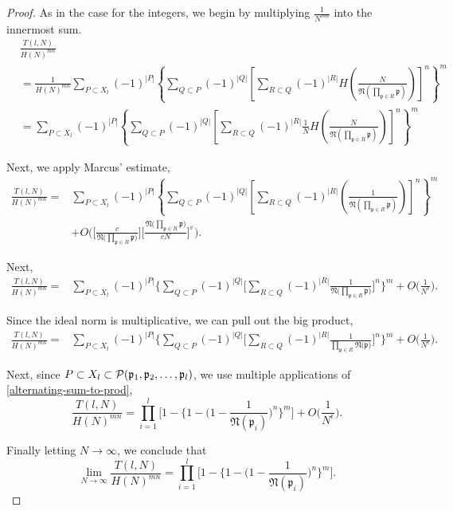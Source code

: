 \documentclass[10pt,a4paper]{article}
\theoremstyle{definition}
\theoremstyle{remark}
\newcommand{\f}[1]{\mathfrak{#1}}
\begin{document}
	\begin{proof}
	As in the case for the integers, we begin by multiplying \(\frac{1}{N^{mn}}\) into the innermost sum.
	\begin{align}
		&\frac{T(l,N)}{H(N)^{mn}} \\
		&= \frac{1}{H(N)^{mn}}\sum_{P\subset X_l}(-1)^{|P|} \left\{\sum_{Q\subset P} (-1)^{|Q|} \left[\sum_{R\subset Q}(-1)^{|R|}H\left(\frac{N}{\f{N}\left(\prod_{\f{p}\in R}\f{p}\right)}\right)\right]^n\right\}^m\\
		&=\sum_{P\subset X_l}(-1)^{|P|} \left\{\sum_{Q\subset P} (-1)^{|Q|} \left[\sum_{R\subset Q}(-1)^{|R|}\frac{1}{N}H\left(\frac{N}{\f{N}\left(\prod_{\f{p}\in R}\f{p}\right)}\right)\right]^n\right\}^m
	\end{align}

	Next, we apply Marcus' estimate,
	\begin{align}
		\frac{T(l,N)}{H(N)^{mn}}=&\sum_{P\subset X_l}(-1)^{|P|} \left\{\sum_{Q\subset P} (-1)^{|Q|} \left[\sum_{R\subset Q}(-1)^{|R|}\left(\frac{1}{\f{N}\left(\prod_{\f{p}\in R}\f{p}\right)}\right)\right]^n\right\}^m \\
		&+ O\Biggl(\Biggl[\frac{c}{\f{N}\bigl(\prod_{\f{p}\in R}\f{p}\bigr)}\Biggl]\Biggr[\frac{\f{N}\bigl(\prod_{\f{p}\in R}\f{p}\bigr)}{cN}\Biggr]^{\varepsilon}\Biggr).
	\end{align}

	Next,
	\begin{equation}
	\begin{split}
		\frac{T(l,N)}{H(N)^{mn}}=&\sum_{P\subset X_l}(-1)^{|P|} \Big\{\sum_{Q\subset P} (-1)^{|Q|} \Big[\sum_{R\subset Q}(-1)^{|R|}\frac{1}{\f{N}\Big(\prod_{\f{p}\in R}\f{p}\Big)} \Big]^n\Big\}^m + O\Big(\frac{1}{N^{\epsilon}}\Big).
	\end{split}
	\end{equation}

	Since the ideal norm is multiplicative, we can pull out the big product,
	\begin{equation}
	\begin{split}
		\frac{T(l,N)}{H(N)^{mn}}=&\sum_{P\subset X_l}(-1)^{|P|} \Biggl\{\sum_{Q\subset P} (-1)^{|Q|} \Biggl[\sum_{R\subset Q}(-1)^{|R|}\frac{1}{\prod_{\f{p}\in R}\f{N}\bigl(\f{p}\bigr)}\Biggr]^n\Biggr\}^m + O\Big(\frac{1}{N^{\epsilon}}\Big).
	\end{split}
        \end{equation}

	Next, since \(P\subset X_l \subset \mathcal{P}(\f{p}_1,\f{p}_2,\mathellipsis,\f{p}_l)\), we use multiple applications of \cref{alternating-sum-to-prod},
		$$\frac{T(l,N)}{H(N)^{mn}}=\prod_{i=1}^{l}\Biggr[1-\Biggr\{1-\Biggl(1-\frac{1}{\f{N}(\f{p}_i)}\Biggr)^n\Biggr\}^m\Biggr] + O\Big(\frac{1}{N^{\epsilon}}\Big).$$
		
\noindent Finally letting $N \to \infty$, we conclude that
$$\lim_{N\to\infty} \frac{T(l,N)}{H(N)^{mn}} = \prod_{i=1}^{l}\Big[1-\Big\{1-\Big(1-\frac{1}{\f{N}(\f{p}_i)}\Big)^n\Big\}^m\Big].$$

\end{proof}



\printbibliography
\end{document}
